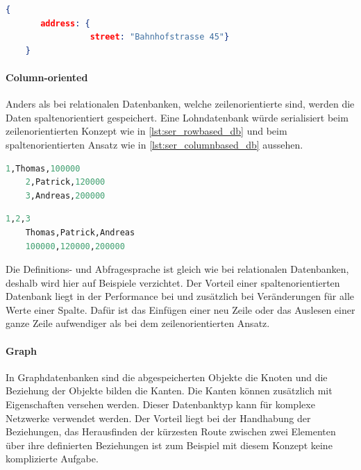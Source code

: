\begin{lstlisting}[language=JSON, caption=Resultat der Abfrage in MongoDB, label=lst:select_result_mongodb]  
    {
       address: {
                 street: "Bahnhofstrasse 45"}
    }
\end{lstlisting}

\paragraph{Column-oriented}
Anders als bei relationalen Datenbanken, welche zeilenorientierte sind, werden die Daten spaltenorientiert gespeichert. Eine Lohndatenbank würde serialisiert beim zeilenorientierten Konzept
wie in \autoref{lst:ser_rowbased_db} und beim spaltenorientierten Ansatz wie in \autoref{lst:ser_columnbased_db} aussehen.

\begin{lstlisting}[language=SQL, caption=Serialisierung zeilenorientierte Datenbank, label=lst:ser_rowbased_db]  
    1,Thomas,100000
    2,Patrick,120000
    3,Andreas,200000
\end{lstlisting}

\begin{lstlisting}[language=SQL, caption=Serialisierung spaltenorientierte Datenbank, label=lst:ser_columnbased_db]  
    1,2,3
    Thomas,Patrick,Andreas
    100000,120000,200000
\end{lstlisting}

Die Definitions- und Abfragesprache ist gleich wie bei relationalen Datenbanken, deshalb wird hier auf Beispiele verzichtet. Der Vorteil 
einer spaltenorientierten Datenbank liegt in der Performance bei  und zusätzlich bei 
Veränderungen für alle Werte einer Spalte. Dafür ist das 
Einfügen einer neu Zeile oder das Auslesen einer ganze Zeile aufwendiger als bei dem zeilenorientierten Ansatz.

\paragraph{Graph}
In Graphdatenbanken sind die abgespeicherten Objekte die Knoten und die Beziehung der Objekte bilden die Kanten. Die Kanten können zusätzlich mit Eigenschaften versehen werden. Dieser 
Datenbanktyp kann für komplexe Netzwerke verwendet werden. Der Vorteil liegt bei der Handhabung der Beziehungen, das Herausfinden der kürzesten Route zwischen zwei Elementen über 
ihre definierten Beziehungen ist zum Beispiel mit diesem Konzept keine komplizierte Aufgabe.

